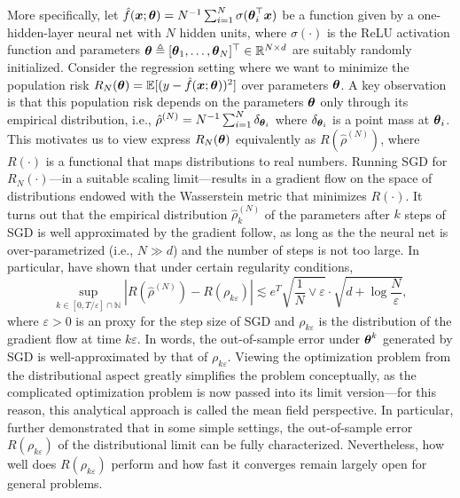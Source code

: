 More specifically, let $\hat f(\text{\boldmath $x$}; \text{\boldmath $\theta$}) = N^{-1} \sum_{i=1}^N \sigma(\text{\boldmath $\theta$}_i^\top \text{\boldmath $x$})$ be a function given by a one-hidden-layer neural net with $N$ hidden units, where $\sigma(\cdot)$ is the ReLU activation function and parameters $\text{\boldmath $\theta$} \triangleq [\text{\boldmath $\theta$}_1,\ldots,\text{\boldmath $\theta$}_N]^\top \in \mathbb{R}^{N \times d}$ are suitably randomly initialized. Consider the regression setting where we want to minimize the population risk $R_N(\text{\boldmath $\theta$}) =  \mathbb{E}[(y - \hat f(\text{\boldmath $x$}; \text{\boldmath $\theta$}))^2]$ over parameters $\text{\boldmath $\theta$}$. A key observation is that this population risk depends on the parameters $\text{\boldmath $\theta$}$ only through its empirical distribution, i.e., $\hat \rho^{(N)} = N^{-1} \sum_{i=1}^N \delta_{\text{\boldmath $\theta$}_i}$ where $\delta_{\text{\boldmath $\theta$}_i}$ is a point mass at $\text{\boldmath $\theta$}_i$. This motivates us to view express $R_N(\text{\boldmath $\theta$})$ equivalently as $R(\hat \rho^{(N)})$, where $R(\cdot)$ is a functional that maps distributions to real numbers. Running SGD for $R_N(\cdot)$---in a suitable scaling limit---results in a gradient flow on the space of distributions endowed with the Wasserstein metric that minimizes $R(\cdot)$. It turns out that the  empirical distribution $\hat \rho^{(N)}_k$ of the parameters after $k$ steps of SGD is well approximated by the gradient follow, as long as the the neural net is over-parametrized (i.e., $N\gg d$) and the number of steps is not too large. In particular, \cite{mei2018mean} have shown that under certain regularity conditions,
\[
\sup_{k\in[0,T/\varepsilon]\cap\mathbb{N}}\left| R(\hat \rho^{(N)})-R\left(\rho_{k\varepsilon}\right)\right|\lesssim e^{T}\sqrt{\frac{1}{N}\vee\varepsilon}\cdot\sqrt{d+\log\frac{N}{\varepsilon}},
\]
where $\varepsilon >0$ is an proxy for the step size of SGD and $\rho_{k\varepsilon}$ is the distribution of the gradient flow at time $k\varepsilon$.  In words, the out-of-sample error under $\text{\boldmath $\theta$}^{k}$ generated by SGD is well-approximated by that of $\rho_{k\varepsilon}$.
Viewing the optimization problem from the distributional aspect greatly simplifies the problem conceptually, as the complicated optimization problem is now passed into its limit version---for this reason, this analytical approach is called the mean field perspective. In particular, \cite{mei2018mean} further demonstrated that in some simple settings, the out-of-sample error $R(\rho_{k\varepsilon})$ of the distributional limit can be fully characterized. Nevertheless, how well does $R(\rho_{k\varepsilon})$ perform and how fast it converges remain largely open for general problems.


